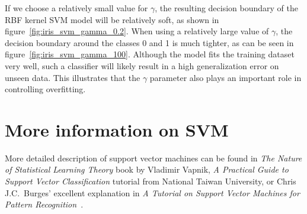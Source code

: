 \documentclass[11pt]{article}
\begin{document}
    If we choose a relatively small value for $\gamma$, the resulting decision boundary of the RBF kernel SVM model will be relatively soft, as shown in figure~\ref{fig:iris_svm_gamma_0.2}.
    When using a relatively large value of $\gamma$, the decision boundary around the classes 0 and 1 is much tighter, as can be seen in figure~\ref{fig:iris_svm_gamma_100}.
    Although the model fits the training dataset very well, such a classifier will likely result in a high generalization error on unseen data.
    This illustrates that the $\gamma$ parameter also plays an important role in controlling overfitting.

    \section{More information on SVM} \label{sec:svm_det}

    More detailed description of support vector machines can be found in \textit{The Nature of Statistical Learning Theory} book by Vladimir Vapnik\cite{Vapnik2000}, \textit{A Practical Guide to Support Vector Classification} tutorial from National Taiwan University\cite{Hsu2003}, or Chris J.C.\ Burges' excellent explanation in
    \textit{A Tutorial on Support Vector Machines for Pattern Recognition}~\cite{Burges1998}.

    \medskip
    
    
\end{document}
